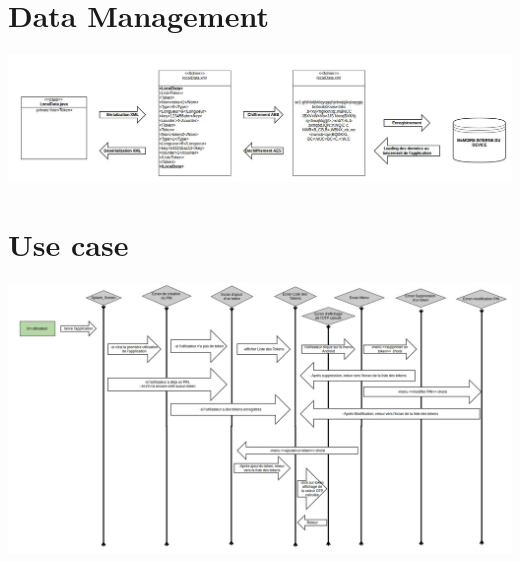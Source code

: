 \documentclass{"../../res/univ-projet"}
\begin{document}
\section{Data Management}
\includegraphics[width=\textwidth]{../graphics/uml_data.jpg}

\section{Use case}
\includegraphics[width=\textwidth]{../graphics/uml_use.jpg}
\end{document}
